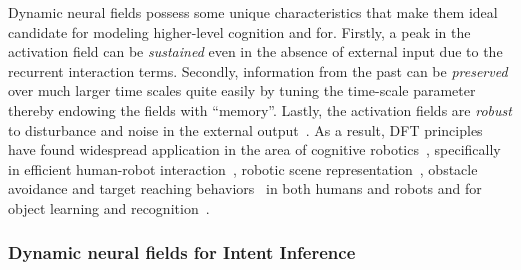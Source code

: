 Dynamic neural fields possess some unique characteristics that make them ideal candidate for modeling higher-level cognition and for. Firstly, a peak in the activation field can be \textit{sustained} even in the absence of external input due to the recurrent interaction terms. Secondly, information from the past can be \textit{preserved} over much larger time scales quite easily by tuning the time-scale parameter thereby endowing the fields with ``memory''. Lastly, the activation fields are \textit{robust} to disturbance and noise in the external output~\cite{schoner2008dynamical}. 
As a result, DFT principles have found widespread application in the area of cognitive robotics~\cite{erlhagen2006dynamic}, specifically in efficient human-robot interaction~\cite{erlhagen2014dynamic}, robotic scene representation~\cite{zibner2011dynamic}, obstacle avoidance and target reaching behaviors~\cite{schoner1995dynamics} in both humans and robots and for object learning and recognition~\cite{faubel2008learning}. 


\subsubsection{Dynamic neural fields for Intent Inference}\label{sssec:dft_ii}

